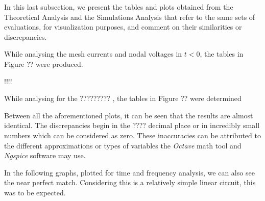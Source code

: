 In this last subsection, we present the tables and plots obtained from the Theoretical Analysis and the Simulations Analysis that refer to the same sets of evaluations, for visualization purposes, and comment on their similarities or discrepancies.

While analysing the mesh currents and nodal voltages in $t<0$, the tables in Figure ?? were produced.

!!!!

While analysing for the ????????? , the tables in Figure ?? were determined


Between all the aforementioned plots, it can be seen that the results are almost identical. The discrepancies begin in the ???? decimal place or in incredibly small numbers which can be considered as zero. These inaccuracies can be attributed to the different approximations or types of variables the \textit{Octave} math tool and \textit{Ngspice} software may use.

In the following graphs, plotted for time and frequency analysis, we can also see the near perfect match. Considering this is a relatively simple linear circuit, this was to be expected.
